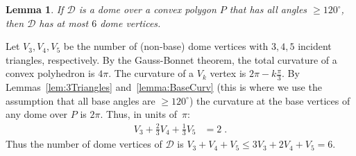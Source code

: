 \documentclass[11pt]{article}
\newcommand{\hide}[1]{}
\newcommand{\ABox}{
\raisebox{3pt}{\framebox[6pt]{\rule{6pt}{0pt}}}
}
\newenvironment{proof}{{\bf Proof:}}{\hfill\ABox\medskip}
\newtheorem{lemma}[theorem]{Lemma}
\newcommand{\lemlab}[1]{\label{lemma:#1}}
\newcommand{\seclab}[1]{\label{sec:#1}}
\newcommand{\lemref}[1]{\ref{lemma:#1}}
\def\D{{\mathcal D}}
\newcommand{\JOR}[1]{{\color{red} JOR: [#1]}}
\newcommand{\Anna}[1]{{\color{red} Anna: [#1]}}
\begin{document}
\begin{lemma}
\lemlab{6dome}
\label{lem:6dome}
If $\D$ is a dome over a convex polygon $P$ that has all angles $\ge 120^\circ$, then $\D$ has at most $6$ dome vertices.
\end{lemma}
\begin{proof}
Let 
$V_3, V_4, V_5$ be the number of (non-base) dome vertices with $3,4,5$ incident triangles,
respectively.
%
By the Gauss-Bonnet theorem, the total curvature of a convex polyhedron is $4\pi$. 
The curvature of a $V_k$ vertex is $2\pi - k \frac{\pi}{3}$.
By Lemmas~\ref{lem:3Triangles} and~\lemref{BaseCurv} 
(this is where we use the assumption that all base angles are $\ge 120^\circ$)
the curvature at the base vertices of any dome over $P$ is $2\pi$. 
Thus, in units of~$\pi$:
\begin{align*}
V_3 +  \frac{2}{3} V_4 + \frac{1}{3} V_5 &= 2 \; .
\end{align*}
Thus
the number of dome vertices of $\D$ is 
$V_3 + V_4 + V_5 \le 3 V_3 +  2 V_4 +  V_5  = 6$. 
%
\end{proof}




\end{document}
